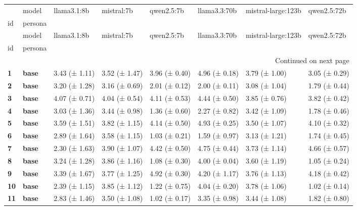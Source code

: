 \begin{longtable}{llllllll}
\toprule
 & model & llama3.1:8b & mistral:7b & qwen2.5:7b & llama3.3:70b & mistral-large:123b & qwen2.5:72b \\
id & persona &  &  &  &  &  &  \\
\midrule
\endfirsthead
\toprule
 & model & llama3.1:8b & mistral:7b & qwen2.5:7b & llama3.3:70b & mistral-large:123b & qwen2.5:72b \\
id & persona &  &  &  &  &  &  \\
\midrule
\endhead
\midrule
\multicolumn{8}{r}{Continued on next page} \\
\midrule
\endfoot
\bottomrule
\endlastfoot
\textbf{1} & \textbf{base} & 3.43 (± 1.11) & 3.52 (± 1.47) & 3.96 (± 0.40) & 4.96 (± 0.18) & 3.79 (± 1.00) & 3.05 (± 0.29) \\
\cline{1-8}
\textbf{2} & \textbf{base} & 3.20 (± 1.28) & 3.16 (± 0.69) & 2.01 (± 0.12) & 2.00 (± 0.11) & 3.08 (± 1.04) & 1.79 (± 0.44) \\
\cline{1-8}
\textbf{3} & \textbf{base} & 4.07 (± 0.71) & 4.04 (± 0.54) & 4.11 (± 0.53) & 4.44 (± 0.50) & 3.85 (± 0.76) & 3.82 (± 0.42) \\
\cline{1-8}
\textbf{4} & \textbf{base} & 3.03 (± 1.36) & 3.44 (± 0.98) & 1.36 (± 0.60) & 2.27 (± 0.82) & 3.42 (± 1.09) & 1.78 (± 0.46) \\
\cline{1-8}
\textbf{5} & \textbf{base} & 3.59 (± 1.51) & 3.82 (± 1.15) & 4.14 (± 0.50) & 4.93 (± 0.25) & 3.50 (± 1.07) & 4.10 (± 0.32) \\
\cline{1-8}
\textbf{6} & \textbf{base} & 2.89 (± 1.64) & 3.58 (± 1.15) & 1.03 (± 0.21) & 1.59 (± 0.97) & 3.13 (± 1.21) & 1.74 (± 0.45) \\
\cline{1-8}
\textbf{7} & \textbf{base} & 2.30 (± 1.63) & 3.90 (± 1.07) & 4.42 (± 0.50) & 4.75 (± 0.44) & 3.73 (± 1.14) & 4.66 (± 0.57) \\
\cline{1-8}
\textbf{8} & \textbf{base} & 3.24 (± 1.28) & 3.86 (± 1.16) & 1.08 (± 0.30) & 4.00 (± 0.04) & 3.60 (± 1.19) & 1.05 (± 0.24) \\
\cline{1-8}
\textbf{9} & \textbf{base} & 3.39 (± 1.67) & 3.77 (± 1.25) & 4.92 (± 0.30) & 4.20 (± 1.17) & 3.76 (± 1.13) & 4.18 (± 0.42) \\
\cline{1-8}
\textbf{10} & \textbf{base} & 2.39 (± 1.15) & 3.85 (± 1.12) & 1.22 (± 0.75) & 4.04 (± 0.20) & 3.78 (± 1.06) & 1.02 (± 0.14) \\
\cline{1-8}
\textbf{11} & \textbf{base} & 2.83 (± 1.46) & 3.50 (± 1.08) & 1.02 (± 0.17) & 3.35 (± 0.98) & 3.44 (± 1.08) & 1.82 (± 0.80) \\

\end{longtable}
